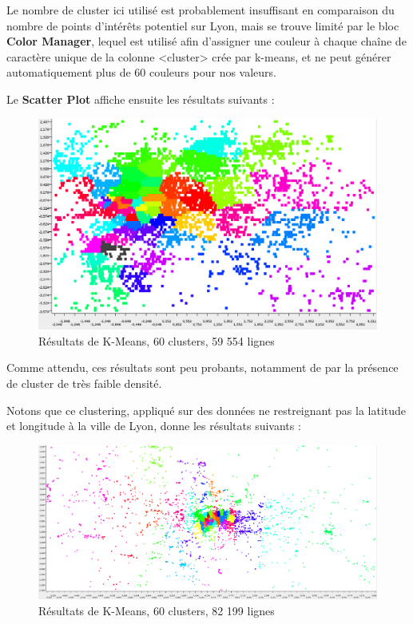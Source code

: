 Le nombre de cluster ici utilisé est probablement insuffisant en comparaison du nombre de points d'intérêts potentiel sur Lyon, mais se trouve limité par le bloc \textbf{Color Manager}, lequel est utilisé afin d'assigner une couleur à chaque chaîne de caractère unique de la colonne <cluster> crée par k-means, et ne peut générer automatiquement plus de 60 couleurs pour nos valeurs.

Le \textbf{Scatter Plot} affiche ensuite les résultats suivants :
\begin{figure}[h!]
    \centering
    \includegraphics[width=\linewidth]{img/60_means_all.png}
    \caption{Résultats de K-Means, 60 clusters, 59 554 lignes}
\end{figure}

Comme attendu, ces résultats sont peu probants, notamment de par la présence de cluster de très faible densité.

Notons que ce clustering, appliqué sur des données ne restreignant pas la latitude et longitude à la ville de Lyon, donne les résultats suivants :
\begin{figure}[h!]
    \centering
    \includegraphics[width=\linewidth]{img/60_means_large.png}
    \caption{Résultats de K-Means, 60 clusters, 82 199 lignes}
\end{figure}

